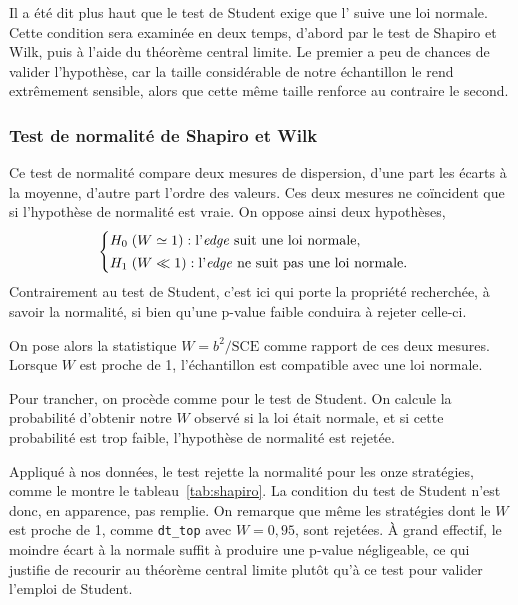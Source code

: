 Il a été dit plus haut que le test de Student exige que l'\edgevar{} suive une
loi normale. Cette condition sera examinée en deux temps, d'abord par le test
de Shapiro et Wilk, puis à l'aide du théorème central limite. Le premier a peu
de chances de valider l'hypothèse, car la taille considérable de notre
échantillon le rend extrêmement sensible, alors que cette même taille renforce
au contraire le second.

\subsubsection*{Test de normalité de Shapiro et Wilk}

Ce test de normalité compare deux mesures de dispersion, d'une part les
écarts à la moyenne, d'autre part l'ordre des valeurs. Ces deux mesures ne
coïncident que si l'hypothèse de normalité est vraie. On oppose ainsi deux
hypothèses,
\[
  \begin{cases}
    H_0 \;(W \simeq 1) : \text{l'\textit{edge}{} suit une loi normale,}\\[2pt]
    H_1 \;(W \ll 1) : \text{l'\textit{edge}{} ne suit pas une loi normale.}
  \end{cases}
\]
Contrairement au test de Student, c'est ici \Hzero{} qui porte la propriété
recherchée, à savoir la normalité, si bien qu'une p-value faible conduira à
rejeter celle-ci.

On pose alors la statistique \(W = b^2 / \mathrm{SCE}\) comme rapport de ces
deux mesures. Lorsque \(W\) est proche de 1, l'échantillon est compatible avec
une loi normale.

Pour trancher, on procède comme pour le test de Student. On calcule la
probabilité d'obtenir notre \(W\) observé si la loi était normale, et si cette
probabilité est trop faible, l'hypothèse de normalité est rejetée.

Appliqué à nos données, le test rejette la normalité pour les onze
stratégies, comme le montre le tableau~\ref{tab:shapiro}. La condition du test
de Student n'est donc, en apparence, pas remplie. On remarque que même les
stratégies dont le \(W\) est proche de 1, comme \texttt{dt\_top} avec
$W = 0{,}95$, sont rejetées. À grand effectif, le moindre écart à la normale
suffit à produire une p-value négligeable, ce qui justifie de recourir au
théorème central limite plutôt qu'à ce test pour valider l'emploi de Student.

